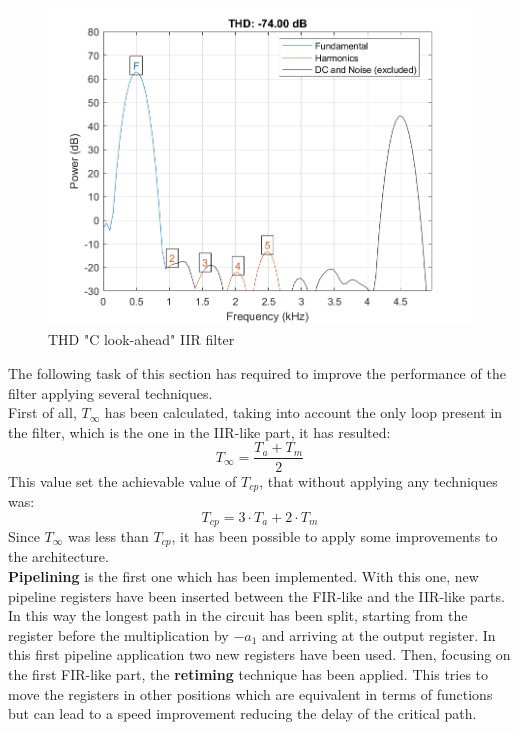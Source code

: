 \documentclass[a4paper, titlepage]{article}
\begin{document}
 \begin{figure} [h]
\centering
	\includegraphics[scale=0.8]{thd_c_la_ref.png}
	\caption{THD "C look-ahead" IIR filter}
	\label{fig:thd_c_la}
\end{figure}
\noindent
The following task of this  section has required to improve the performance of the filter applying several techniques.\\
First of all, $T_{\infty}$ has been calculated, taking into account the only loop present in the filter, which is the one in the IIR-like part, it has resulted:
\begin{equation}
    T_{\infty}=\dfrac{T_a+T_m}{2}
\end{equation}
This value set the achievable value of $T_{cp}$, that without applying any techniques was:
\begin{equation}
    T_{cp}=3 \cdot T_a+2 \cdot T_m
\end{equation}
Since $T_{\infty}$ was less than $T_{cp}$, it has been possible to apply some improvements to the architecture.\\
\textbf{Pipelining} is the first one which has been implemented. With this one, new pipeline registers have been inserted between the FIR-like and the IIR-like parts. In this way the longest path in the circuit has been split, starting from the register before the multiplication by $-a_{1}$ and arriving at the output register. In this first pipeline application two new registers have been used.
\newline
Then, focusing on the first FIR-like part, the \textbf{retiming} technique has been applied. This tries to move the registers in other positions which are equivalent in terms of functions but can lead to a speed improvement reducing the delay of the critical path.\\
\end{document}
